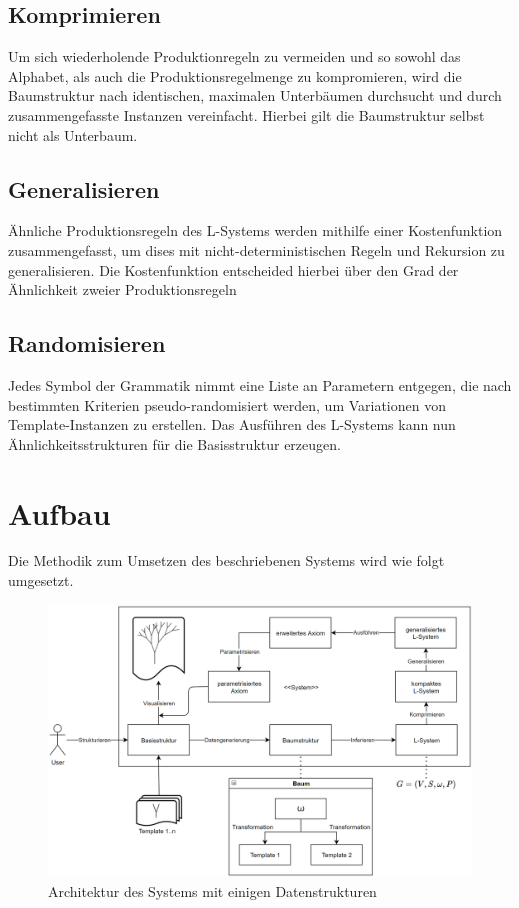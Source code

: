 \subsection*{Komprimieren}
Um sich wiederholende Produktionregeln zu vermeiden und so sowohl das Alphabet, als auch die Produktionsregelmenge
zu kompromieren, wird die Baumstruktur nach identischen, maximalen Unterbäumen durchsucht und durch zusammengefasste
Instanzen vereinfacht.
Hierbei gilt die Baumstruktur selbst nicht als Unterbaum.

\subsection*{Generalisieren}
Ähnliche Produktionsregeln des L-Systems werden mithilfe einer Kostenfunktion zusammengefasst, um dises mit
nicht-deterministischen Regeln und Rekursion zu generalisieren.
Die Kostenfunktion entscheided hierbei über den Grad der Ähnlichkeit zweier Produktionsregeln

\subsection*{Randomisieren}
Jedes Symbol der Grammatik nimmt eine Liste an Parametern entgegen, die nach bestimmten Kriterien pseudo-randomisiert
werden, um Variationen von Template-Instanzen zu erstellen.
Das Ausführen des L-Systems kann nun Ähnlichkeitsstrukturen für die Basisstruktur erzeugen.

\section{Aufbau}

Die Methodik zum Umsetzen des beschriebenen Systems wird wie folgt umgesetzt.

\begin{figure}[H]
    \centering
    \includegraphics[width=14cm]{../images/System.PNG}
    \caption[Systemarchitektur]{Architektur des Systems mit einigen Datenstrukturen}
\end{figure}

